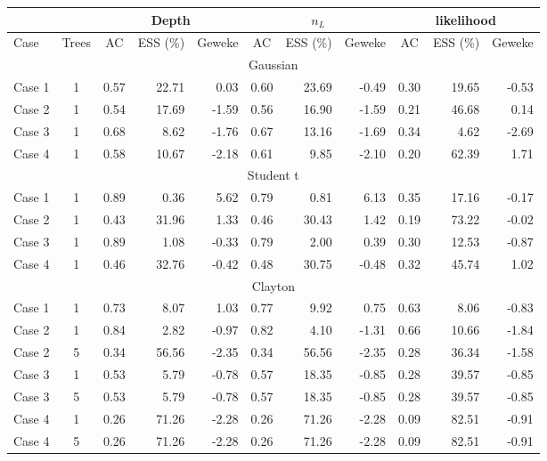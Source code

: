 \documentclass{amsart}
\begin{document}
\begin{table}[ht]
	\centering
	\scriptsize{
		\begin{tabular}{lc|crr|crr|crr}
			\toprule
			\multicolumn{2}{c|}{} &
			\multicolumn{3}{c|}{Depth} &
			\multicolumn{3}{c|}{$n_L$} &
			\multicolumn{3}{c}{likelihood} \\
			\midrule
			Case & Trees & AC & ESS (\%) & Geweke & AC & ESS (\%) & Geweke & AC & ESS (\%) & Geweke \\ 
			\midrule
			\multicolumn{11}{c}{Gaussian} \\
			\midrule
			Case 1 & 1 & 0.57 & 22.71 & 0.03 & 0.60 & 23.69 & -0.49 & 0.30 & 19.65 & -0.53 \\ 
			Case 2 & 1 & 0.54 & 17.69 & -1.59 & 0.56 & 16.90 & -1.59 & 0.21 & 46.68 & 0.14 \\ 
			Case 3 & 1 & 0.68 & 8.62 & -1.76 & 0.67 & 13.16 & -1.69 & 0.34 & 4.62 & -2.69 \\ 
			Case 4 & 1 & 0.58 & 10.67 & -2.18 & 0.61 & 9.85 & -2.10 & 0.20 & 62.39 & 1.71 \\ 
			\midrule
			\multicolumn{11}{c}{Student t} \\
			\midrule
			Case 1 & 1 & 0.89 & 0.36 & 5.62 & 0.79 & 0.81 & 6.13 & 0.35 & 17.16 & -0.17 \\ 
			Case 2 & 1 & 0.43 & 31.96 & 1.33 & 0.46 & 30.43 & 1.42 & 0.19 & 73.22 & -0.02 \\ 
			Case 3 & 1 & 0.89 & 1.08 & -0.33 & 0.79 & 2.00 & 0.39 & 0.30 & 12.53 & -0.87 \\ 
			Case 4 & 1 & 0.46 & 32.76 & -0.42 & 0.48 & 30.75 & -0.48 & 0.32 & 45.74 & 1.02 \\ 
			\midrule
			\multicolumn{11}{c}{Clayton} \\
			\midrule
			Case 1 & 1 & 0.73 & 8.07 & 1.03 & 0.77 & 9.92 & 0.75 & 0.63 & 8.06 & -0.83 \\ 
			Case 2 & 1 & 0.84 & 2.82 & -0.97 & 0.82 & 4.10 & -1.31 & 0.66 & 10.66 & -1.84  \\ 
			Case 2 & 5 & 0.34 & 56.56 & -2.35 & 0.34 & 56.56 & -2.35 & 0.28 & 36.34 & -1.58 \\ 
			Case 3 & 1 & 0.53 & 5.79 & -0.78 & 0.57 & 18.35 & -0.85 & 0.28 & 39.57 & -0.85 \\ 
			Case 3 & 5 & 0.53 & 5.79 & -0.78 & 0.57 & 18.35 & -0.85 & 0.28 & 39.57 & -0.85 \\ 
			Case 4 & 1 & 0.26 & 71.26 & -2.28 & 0.26 & 71.26 & -2.28 & 0.09 & 82.51 & -0.91 \\ 
			Case 4 & 5 & 0.26 & 71.26 & -2.28 & 0.26 & 71.26 & -2.28 & 0.09 & 82.51 & -0.91 \\ 

\end{tabular}}
\end{table}
\end{document}
